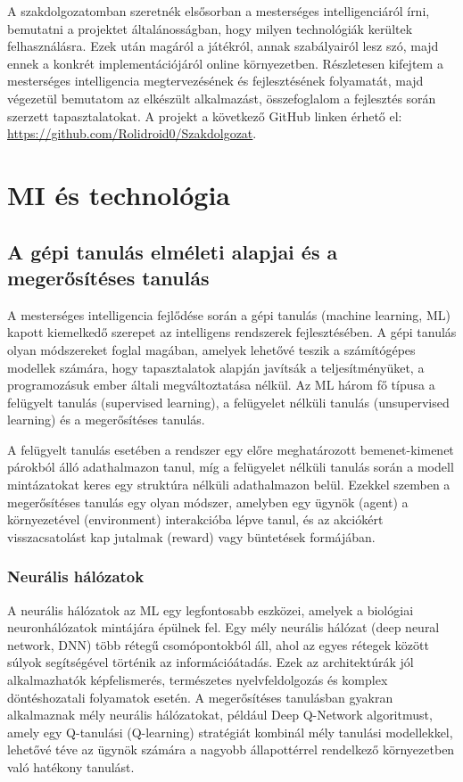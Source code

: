 \documentclass[
]{thesis-ekf}
\theoremstyle{definition}
\theoremstyle{remark}
\begin{document}
	A szakdolgozatomban szeretnék elsősorban a mesterséges intelligenciáról írni, bemutatni a projektet általánosságban, hogy milyen technológiák kerültek felhasználásra. Ezek után magáról a játékról, annak szabályairól lesz szó, majd ennek a konkrét implementációjáról online környezetben. Részletesen kifejtem a mesterséges intelligencia megtervezésének és fejlesztésének folyamatát, majd végezetül bemutatom az elkészült alkalmazást, összefoglalom a fejlesztés során szerzett tapasztalatokat. A projekt a következő GitHub linken érhető el: \url{https://github.com/Rolidroid0/Szakdolgozat}.
	
	\chapter{MI és technológia}
	
	\section{A gépi tanulás elméleti alapjai és a megerősítéses tanulás}
	
	A mesterséges intelligencia fejlődése során a gépi tanulás (machine learning, ML) kapott kiemelkedő szerepet az intelligens rendszerek fejlesztésében. A gépi tanulás olyan módszereket foglal magában, amelyek lehetővé teszik a számítógépes modellek számára, hogy tapasztalatok alapján javítsák a teljesítményüket, a programozásuk ember általi megváltoztatása nélkül. Az ML három fő típusa a felügyelt tanulás (supervised learning), a felügyelet nélküli tanulás (unsupervised learning) és a megerősítéses tanulás. \cite{ML}
	
	A felügyelt tanulás esetében a rendszer egy előre meghatározott bemenet-kimenet párokból álló adathalmazon tanul, míg a felügyelet nélküli tanulás során a modell mintázatokat keres egy struktúra nélküli adathalmazon belül. Ezekkel szemben a megerősítéses tanulás egy olyan módszer, amelyben egy ügynök (agent) a környezetével (environment) interakcióba lépve tanul, és az akciókért visszacsatolást kap jutalmak (reward) vagy büntetések formájában.
	
	\subsection{Neurális hálózatok}
	
	A neurális hálózatok az ML egy legfontosabb eszközei, amelyek a biológiai neuronhálózatok mintájára épülnek fel. \cite{NN2} Egy mély neurális hálózat (deep neural network, DNN) több rétegű csomópontokból áll, ahol az egyes rétegek között súlyok segítségével történik az információátadás. Ezek az architektúrák jól alkalmazhatók képfelismerés, természetes nyelvfeldolgozás és komplex döntéshozatali folyamatok esetén. A megerősítéses tanulásban gyakran alkalmaznak mély neurális hálózatokat, például Deep Q-Network algoritmust, amely egy Q-tanulási (Q-learning) stratégiát kombinál mély tanulási modellekkel, lehetővé téve az ügynök számára a nagyobb állapottérrel rendelkező környezetben való hatékony tanulást. \cite{NN}
	
\end{document}
